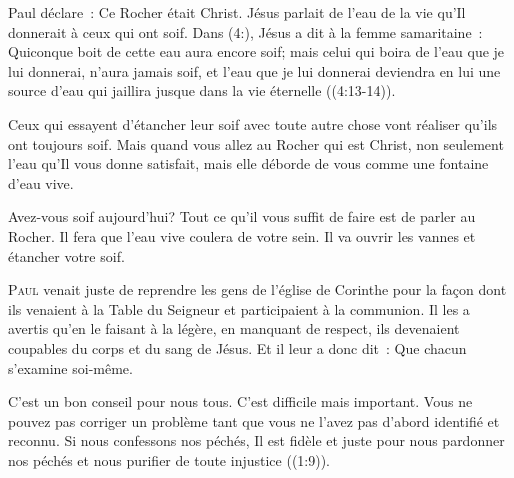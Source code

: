 
Paul déclare~:
 \og Ce Rocher était Christ. \fg{}
 Jésus parlait de l'eau de la vie qu'Il donnerait
 à ceux qui ont soif. Dans (4:),
 Jésus a dit à la femme samaritaine~:
 \og Quiconque boit de cette eau aura encore soif;
 mais celui qui boira de l'eau que je lui donnerai,
 n'aura jamais soif, et l'eau que je lui donnerai
 deviendra en lui une source d'eau qui jaillira
 jusque dans la vie éternelle \fg{}
 ((4:13-14)).

Ceux qui essayent d'étancher leur soif
 avec toute autre chose vont réaliser qu'ils ont toujours soif.
 Mais quand vous allez au Rocher qui est Christ,
 non seulement l'eau qu'Il vous donne satisfait,
 mais elle déborde de vous comme une fontaine d'eau vive.

Avez-vous soif aujourd'hui?
 Tout ce qu'il vous suffit de faire est de parler au Rocher.
 Il fera que l'eau vive coulera de votre sein.
 Il va ouvrir les vannes et étancher votre soif.

\dvrule






\lettrine{P}{aul} venait juste de reprendre
 les gens de l'église de  Corinthe
 pour la façon dont ils venaient à la Table du Seigneur
 et participaient à la communion.
 Il les a avertis qu'en le faisant à la légère,
 en manquant de respect, ils devenaient coupables
 du corps et du sang de Jésus.
 Et il leur a donc dit~: 
 \og Que chacun s'examine soi-même. \fg{}

C'est un bon conseil pour nous tous. C'est difficile mais important.
 Vous ne pouvez pas corriger un problème tant que vous ne l'avez pas
 d'abord identifié et reconnu.
 \og Si nous confessons nos péchés, Il est fidèle et juste
 pour nous pardonner nos péchés et nous purifier
 de toute injustice \fg{} ((1:9)).

